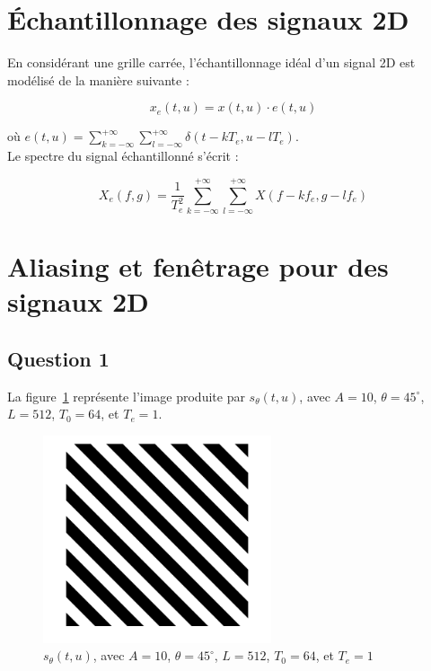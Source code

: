 \documentclass[a4paper]{article}
\newcommand{\figref}[1]{figure~\ref{#1}}
\begin{document}
\newpage

\section*{Échantillonnage des signaux 2D}

En considérant une grille carrée, l'échantillonnage idéal d'un signal
2D est modélisé de la manière suivante :

\begin{equation}
    x_e(t,u) = x(t,u) \cdot e(t,u)
\label{eq:sig-e}
\end{equation}

où $e(t,u) = \sum_{k=-\infty}^{+\infty}\sum_{l=-\infty}^{+\infty}
\delta(t-kT_e,u-lT_e)$.\\

Le spectre du signal échantillonné s'écrit :

\begin{equation}
    X_e(f,g) =
    \frac{1}{T_{e}^2}\sum_{k=-\infty}^{+\infty}\sum_{l=-\infty}^{+\infty}
    X(f-kf_e,g-lf_e)
\label{eq:spectre-e}
\end{equation}

\section{Aliasing et fenêtrage pour des signaux 2D}

\subsection*{Question 1}

La \figref{img:sin1} représente l'image produite par $s_{\theta}(t,u)$,
avec $A=10$, $\theta=45^\circ$, $L=512$, $T_0=64$, et $T_e=1$.

\begin{figure}[H]
	\center 
	\includegraphics[width=0.6\textwidth]{images/sin1.png}
    \caption{$s_{\theta}(t,u)$,
avec $A=10$, $\theta=45^\circ$, $L=512$, $T_0=64$, et $T_e=1$
}
    \label{img:sin1}
\end{figure}
\end{document}
